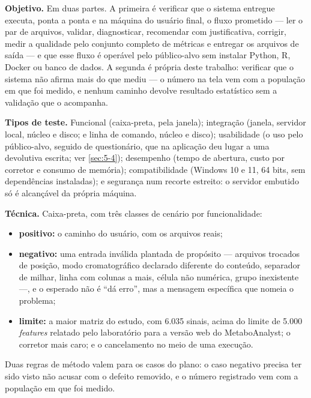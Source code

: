 \textbf{Objetivo.} Em duas partes. A primeira é verificar que o sistema entregue executa, ponta a ponta e na máquina do usuário final, o fluxo prometido --- ler o par de arquivos, validar, diagnosticar, recomendar com justificativa, corrigir, medir a qualidade pelo conjunto completo de métricas e entregar os arquivos de saída --- e que esse fluxo é operável pelo público-alvo sem instalar Python, R, Docker ou banco de dados. A segunda é própria deste trabalho: verificar que o sistema não afirma mais do que mediu --- o número na tela vem com a população em que foi medido, e nenhum caminho devolve resultado estatístico sem a validação que o acompanha.

\textbf{Tipos de teste.} Funcional (caixa-preta, pela janela); integração (janela, servidor local, núcleo e disco; e linha de comando, núcleo e disco); usabilidade (o uso pelo público-alvo, seguido de questionário, que na aplicação deu lugar a uma devolutiva escrita; ver \ref{sec:5-4}); desempenho (tempo de abertura, custo por corretor e consumo de memória); compatibilidade (Windows 10 e 11, 64 bits, sem dependências instaladas); e segurança num recorte estreito: o servidor embutido só é alcançável da própria máquina.

\textbf{Técnica.} Caixa-preta, com três classes de cenário por funcionalidade:

\begin{itemize}
\item \textbf{positivo:} o caminho do usuário, com os arquivos reais;
\item \textbf{negativo:} uma entrada inválida plantada de propósito --- arquivos trocados de posição, modo cromatográfico declarado diferente do conteúdo, separador de milhar, linha com colunas a mais, célula não numérica, grupo inexistente ---, e o esperado não é ``dá erro'', mas a mensagem específica que nomeia o problema;
\item \textbf{limite:} a maior matriz do estudo, com 6.035 sinais, acima do limite de 5.000 \textit{features} relatado pelo laboratório para a versão web do MetaboAnalyst; o corretor mais caro; e o cancelamento no meio de uma execução.
\end{itemize}

Duas regras de método valem para os casos do plano: o caso negativo precisa ter sido visto não acusar com o defeito removido, e o número registrado vem com a população em que foi medido.


